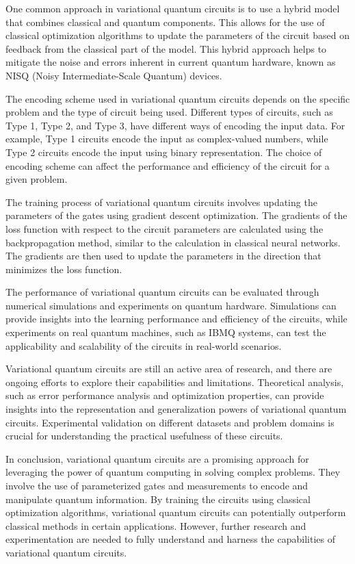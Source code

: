 \documentclass[inscr,ack,preface]{diphdthesis}
\begin{document}
One common approach in variational quantum circuits is to use a hybrid model that combines classical and quantum components. This allows for the use of classical optimization algorithms to update the parameters of the circuit based on feedback from the classical part of the model. This hybrid approach helps to mitigate the noise and errors inherent in current quantum hardware, known as NISQ (Noisy Intermediate-Scale Quantum) devices.

The encoding scheme used in variational quantum circuits depends on the specific problem and the type of circuit being used. Different types of circuits, such as Type 1, Type 2, and Type 3, have different ways of encoding the input data. For example, Type 1 circuits encode the input as complex-valued numbers, while Type 2 circuits encode the input using binary representation. The choice of encoding scheme can affect the performance and efficiency of the circuit for a given problem.

The training process of variational quantum circuits involves updating the parameters of the gates using gradient descent optimization. The gradients of the loss function with respect to the circuit parameters are calculated using the backpropagation method, similar to the calculation in classical neural networks. The gradients are then used to update the parameters in the direction that minimizes the loss function.

The performance of variational quantum circuits can be evaluated through numerical simulations and experiments on quantum hardware. Simulations can provide insights into the learning performance and efficiency of the circuits, while experiments on real quantum machines, such as IBMQ systems, can test the applicability and scalability of the circuits in real-world scenarios.

Variational quantum circuits are still an active area of research, and there are ongoing efforts to explore their capabilities and limitations. Theoretical analysis, such as error performance analysis and optimization properties, can provide insights into the representation and generalization powers of variational quantum circuits. Experimental validation on different datasets and problem domains is crucial for understanding the practical usefulness of these circuits.

In conclusion, variational quantum circuits are a promising approach for leveraging the power of quantum computing in solving complex problems. They involve the use of parameterized gates and measurements to encode and manipulate quantum information. By training the circuits using classical optimization algorithms, variational quantum circuits can potentially outperform classical methods in certain applications. However, further research and experimentation are needed to fully understand and harness the capabilities of variational quantum circuits.
\end{document}
